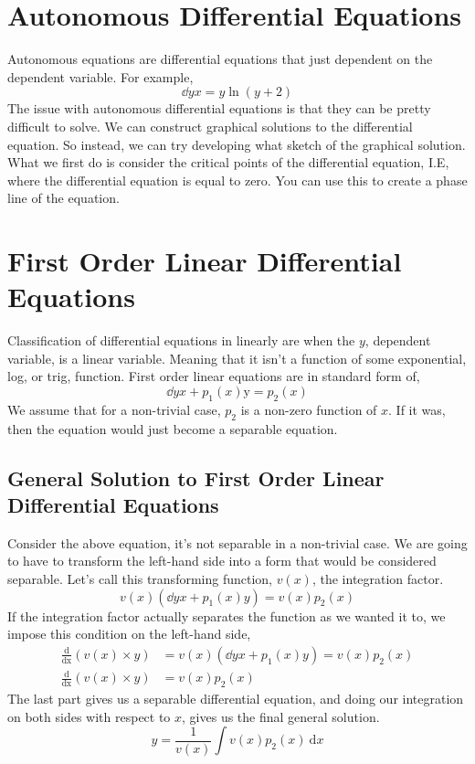 \section{Autonomous Differential Equations}
Autonomous equations are differential equations that just dependent on the dependent variable. For example, 
\begin{equation*}
	\dd{y}{x} = y \ln (y+2)
\end{equation*} 
The issue with autonomous differential equations is that they can be pretty difficult to solve. We can construct graphical solutions to the differential equation. So instead, we can try developing what sketch of the graphical solution. What we first do is consider the critical points of the differential equation, I.E, where the differential equation is equal to zero. You can use this to create a phase line of the equation.
\pagebreak
\section{First Order Linear Differential Equations}
Classification of differential equations in linearly are when the $y$, dependent variable, is a linear variable. Meaning that it isn't a function of some exponential, log, or trig, function. First order linear equations are in standard form of,
\begin{equation*}
	\dd{y}{x} + p_1(x)\mathrm{y} = p_2(x)
\end{equation*}
We assume that for a non-trivial case, $p_2$ is a non-zero function of $x$. If it was, then the equation would just become a separable equation. 
\subsection{General Solution to First Order Linear Differential Equations}
Consider the above equation, it's not separable in a non-trivial case. We are going to have to transform the left-hand side into a form that would be considered separable. Let's call this transforming function, $v(x)$, the integration factor.
\begin{equation*}
	v(x)(\dd{y}{x}+p_1(x)y) = v(x)p_2(x)
\end{equation*}
If the integration factor actually separates the function as we wanted it to, we impose this condition on the left-hand side,
\begin{align*}
	\frac{\mathrm{d}}{\mathrm{dx}} (v(x) \times y) &= v(x)(\dd{y}{x}+p_1(x)y) = v(x)p_2(x) \\ 
	\frac{\mathrm{d}}{\mathrm{dx}} (v(x) \times y) &= v(x)p_2(x)
\end{align*}
The last part gives us a separable differential equation, and doing our integration on both sides with respect to $x$, gives us the final general solution.
\begin{equation*}
	y = \frac{1}{v(x)}\int v(x)p_2(x) \: \mathrm{d}x 
\end{equation*}

